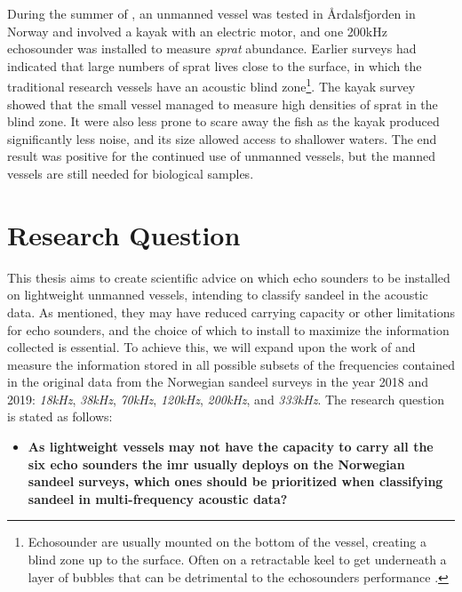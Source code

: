        During the summer of \citeyear{johnsen2020measuring}, an unmanned vessel was tested in Årdalsfjorden in Norway and involved a kayak with an electric motor, and one 200kHz echosounder was installed to measure \textit{sprat} abundance. Earlier surveys had indicated that large numbers of sprat lives close to the surface, in which the traditional research vessels have an acoustic blind zone\footnote{Echosounder are usually mounted on the bottom of the vessel, creating a blind zone up to the surface. Often on a retractable keel to get underneath a layer of bubbles that can be detrimental to the echosounders performance \cite{korneliussen2008proposals}.}. The kayak survey showed that the small vessel managed to measure high densities of sprat in the blind zone. It were also less prone to scare away the fish as the kayak produced significantly less noise, and its size allowed access to shallower waters. The end result was positive for the continued use of unmanned vessels, but the manned vessels are still needed for biological samples\cite{johnsen2020measuring}.
        


\section{Research Question}
        This thesis aims to create scientific advice on which echo sounders to be installed on lightweight unmanned vessels, intending to classify sandeel in the acoustic data. As mentioned, they may have reduced carrying capacity or other limitations for echo sounders, and the choice of which to install to maximize the information collected is essential. To achieve this, we will expand upon the work of \citeauthor{brautaset2020acoustic} and measure the information stored in all possible subsets of the frequencies contained in the original data from the Norwegian sandeel surveys in the year 2018 and 2019: \textit{18kHz}, \textit{38kHz}, \textit{70kHz}, \textit{120kHz}, \textit{200kHz}, and \textit{333kHz}. The research question is stated as follows:
        
        
    \begin{itemize}
        \item \textbf{As lightweight vessels may not have the capacity to carry all the six echo sounders the \gls{imr} usually deploys on the Norwegian sandeel surveys, which ones should be prioritized when classifying sandeel in multi-frequency acoustic data?}
        
    \end{itemize}


